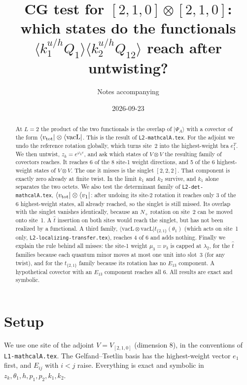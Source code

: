 \documentclass[11pt]{article}
\title{CG test for $[2,1,0]\otimes[2,1,0]$: which states do the functionals\\
$\langle k_1^{u/h}Q_1\rangle\langle k_2^{u/h}Q_{12}\rangle$ reach after untwisting?}
\author{Notes accompanying \nb{xxx-210-cg-test.wb}}
\date{2026-09-23}
\newcommand{\vacL}{\langle\mathrm{vacL}|}
\newcommand{\nb}[1]{\texttt{#1}}
\theoremstyle{definition}
\theoremstyle{remark}
\begin{document}
\maketitle

\begin{abstract}
At $L=2$ the product of the two functionals is the overlap of $|\Psi_A\rangle$ with a covector of the form $\langle v_{\rm tot}|\otimes\vacL$. This is the result of \nb{L2-mathcalA.tex}. For the adjoint we undo the reference rotation globally, which turns site~2 into the highest-weight bra $e_1^T$. We then untwist, $z_k=e^{\varphi_k\varepsilon}$, and ask which states of $V\otimes V$ the resulting family of covectors reaches. It reaches 6 of the 8 site-1 weight directions, and 5 of the 6 highest-weight states of $V\otimes V$. The one it misses is the singlet $[2,2,2]$. That component is exactly zero already at finite twist. In the limit $k_1$ and $k_2$ survive, and $k_1$ alone separates the two octets. We also test the determinant family of \nb{L2-det-mathcalA.tex}, $\langle v_{\rm tot}|\otimes\langle v_1|$: after undoing its site-2 rotation it reaches only 3 of the 6 highest-weight states, all already reached, so the singlet is still missed. Its overlap with the singlet vanishes identically, because an $N_+$ rotation on site~2 can be moved onto site~1. A $\hat t$ insertion on both sites would reach the singlet, but has not been realized by a functional. A third family, $\langle\mathrm{vacL}\otimes\mathrm{vacL}|t_{\{2,1\}}(\theta_1)$ (which acts on site~1 only, \nb{L2-localizing-transfer.tex}), reaches 4 of 6 and adds nothing. Finally we explain the rule behind all misses: the site-1 weight $\mu_3=\nu_3$ is capped at $\lambda_2$, for the $\hat t$ families because each quantum minor moves at most one unit into slot~3 (for any twist), and for the $t_{\{2,1\}}$ family because its rotation has no $E_{13}$ component. A hypothetical covector with an $E_{13}$ component reaches all 6. All results are exact and symbolic.
\end{abstract}

\tableofcontents

\section{Setup}

We use one site of the adjoint $V=V_{[2,1,0]}$ (dimension 8), in the conventions of \nb{L1-mathcalA.tex}. The Gelfand--Tsetlin basis has the highest-weight vector $e_1$ first, and $E_{ij}$ with $i<j$ raise. Everything is exact and symbolic in $z_k,\theta_1,h,p_1,p_2,k_1,k_2$.
\end{document}

